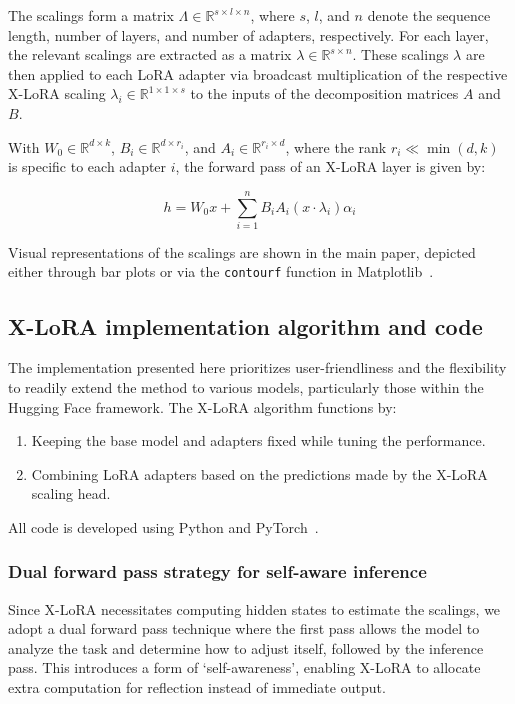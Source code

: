 The scalings form a matrix $\Lambda \in \mathbb{R}^{s \times l \times n}$, where $s$, $l$, and $n$ denote the sequence length, number of layers, and number of adapters, respectively. For each layer, the relevant scalings are extracted as a matrix $\lambda \in \mathbb{R}^{s \times n}$. These scalings $\lambda$ are then applied to each LoRA adapter via broadcast multiplication of the respective X-LoRA scaling $\lambda_i \in \mathbb{R}^{1 \times 1 \times s}$ to the inputs of the decomposition matrices $A$ and $B$.

With $W_0 \in \mathbb{R}^{d \times k}$, $B_i \in \mathbb{R}^{d \times r_i}$, and $A_i \in \mathbb{R}^{r_i \times d}$, where the rank $r_i \ll \min(d,k)$ is specific to each adapter $i$, the forward pass of an X-LoRA layer is given by:

\begin{equation}
    h = W_0x + \sum_{i=1}^{n} B_iA_i(x \cdot  \lambda_i) \alpha_i
\end{equation}

Visual representations of the scalings are shown in the main paper, depicted either through bar plots or via the \texttt{contourf} function in Matplotlib~\cite{MatplotlibDocumentation}.

\subsection{X-LoRA implementation algorithm and code} The implementation presented here prioritizes user-friendliness and the flexibility to readily extend the method to various models, particularly those within the Hugging Face framework. The X-LoRA algorithm functions by:

\begin{enumerate}
    \item Keeping the base model and adapters fixed while tuning the performance.
    \item Combining LoRA adapters based on the predictions made by the X-LoRA scaling head.
\end{enumerate}

All code is developed using Python and PyTorch~\cite{Paszke2019PyTorchLibrary}. 

\subsubsection{Dual forward pass strategy for self-aware inference} Since X-LoRA necessitates computing hidden states to estimate the scalings, we adopt a dual forward pass technique where the first pass allows the model to analyze the task and determine how to adjust itself, followed by the inference pass. This introduces a form of ‘self-awareness’, enabling X-LoRA to allocate extra computation for reflection instead of immediate output.

